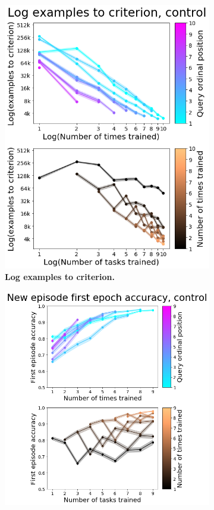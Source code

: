 \begin{figure}[!htb]
\centering
\begin{subfigure}{.49\textwidth}
  \centering
    \includegraphics[width=0.85\linewidth]{ch-results/figures/control_sequential/examples_to_criterion.png}
    \caption{ {\bf Log examples to criterion.}}
    \label{fig:results-control-sequential-examples-to-criterion}
\end{subfigure}
\begin{subfigure}{.49\textwidth}
  \centering
    \includegraphics[width=\linewidth]{ch-results/figures/control_sequential/first_episode_accuracy.png}

\end{subfigure}
\end{figure}
